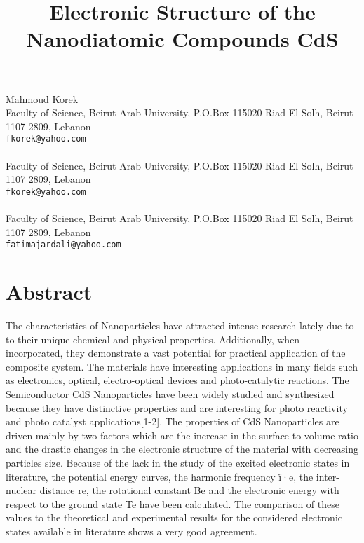 \title{Electronic Structure of the Nanodiatomic Compounds CdS}
 \author{} \institute{}
\maketitle
\begin{center}
{\large Mahmoud Korek}\\
Faculty of Science, Beirut Arab University, P.O.Box 115020 Riad El Solh, Beirut 1107 2809, Lebanon\\
{\tt fkorek@yahoo.com}
\\ \vspace{4mm}{\large Khalil Badreddine}\\
Faculty of Science, Beirut Arab University, P.O.Box 115020 Riad El Solh, Beirut 1107 2809, Lebanon\\
{\tt fkorek@yahoo.com}
\\ \\
Faculty of Science, Beirut Arab University, P.O.Box 115020 Riad El Solh, Beirut 1107 2809, Lebanon\\
{\tt fatimajardali@yahoo.com}

\end{center}

\section*{Abstract}

The characteristics of Nanoparticles have attracted intense research lately due to to their unique chemical and physical properties. Additionally, when incorporated, they demonstrate a vast potential for practical application of the composite system. The materials have interesting applications in many fields such as electronics, optical, electro-optical devices and photo-catalytic reactions. The Semiconductor CdS Nanoparticles have been widely studied and synthesized because they have  distinctive properties and are interesting for photo reactivity and photo catalyst applications[1-2]. The properties of CdS Nanoparticles are driven mainly by two factors which are the increase in the surface to volume ratio and the drastic changes in the electronic structure of the material with decreasing particles size. Because of the lack in the study of the excited electronic states in literature, the potential energy curves, the harmonic frequency ï·e, the inter-nuclear distance re, the rotational constant Be and the electronic energy with respect to the ground state Te have been calculated. The comparison of these values to the theoretical and experimental results for the considered electronic states available in literature shows a very good agreement.

